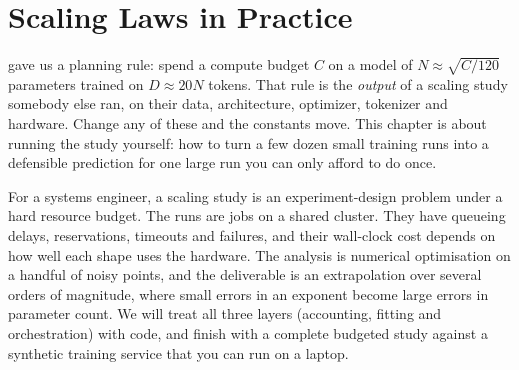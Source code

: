 \chapter{Scaling Laws in Practice}\label{ch:scalinglaws}

 gave us a planning rule: spend a compute budget $C$ on a model of
$N\approx\sqrt{C/120}$ parameters trained on $D\approx 20N$ tokens. That rule is the
\emph{output} of a scaling study somebody else ran, on their data, architecture, optimizer,
tokenizer and hardware. Change any of these and the constants move. This chapter is about
running the study yourself: how to turn a few dozen small training runs into a defensible
prediction for one large run you can only afford to do once.

For a systems engineer, a scaling study is an experiment-design problem under a hard resource
budget. The runs are jobs on a shared cluster. They have queueing delays, reservations, timeouts
and failures, and their wall-clock cost depends on how well each shape uses the hardware.
The analysis is numerical optimisation on a handful of noisy points, and the deliverable is an
extrapolation over several orders of magnitude, where small errors in an exponent become large
errors in parameter count. We will treat all three layers (accounting, fitting and
orchestration) with code, and finish with a complete budgeted study against a synthetic training
service that you can run on a laptop.

